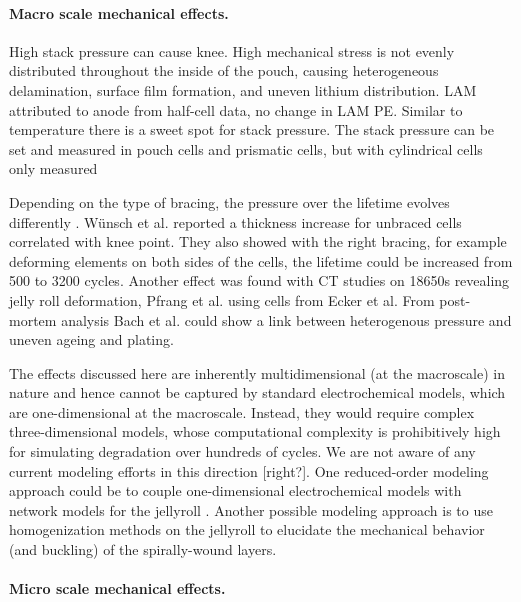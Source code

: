 \documentclass{article}
\begin{document}
\paragraph{Macro scale mechanical effects.}

High stack pressure can cause knee. High mechanical stress is not evenly distributed throughout the inside of the pouch, causing heterogeneous delamination, surface film formation, and uneven lithium distribution. LAM attributed to anode from half-cell data, no change in LAM PE. Similar to temperature there is a sweet spot for stack pressure\cite{cannarella_stress_2014}. The stack pressure can be set and measured in pouch cells \cite{wunsch_investigation_2019} and prismatic cells\cite{cannarella_stress_2014}, but  with cylindrical cells only measured\cite{willenberg_high-precision_2020}

Depending on the type of bracing, the pressure over the lifetime evolves differently . Wünsch et al. \cite{wunsch_investigation_2019} reported a thickness increase for unbraced cells correlated with knee point. They also showed with the right bracing, for example deforming elements on both sides of the cells, the lifetime could be increased from 500 to 3200 cycles.
Another effect was found with CT studies on 18650s revealing jelly roll deformation, Pfrang et al. \cite{pfrang_long-term_2018} using cells from Ecker et al. \cite{ecker_calendar_2014}
From post-mortem analysis Bach et al. could show a link between heterogenous pressure and uneven ageing and plating\cite{bach_nonlinear_2016}.

The effects discussed here are inherently multidimensional (at the macroscale) in nature and hence cannot be captured by standard electrochemical models, which are one-dimensional at the macroscale. Instead, they would require complex three-dimensional models, whose computational complexity is prohibitively high for simulating degradation over hundreds of cycles. We are not aware of any current modeling efforts in this direction [right?]. One reduced-order modeling approach could be to couple one-dimensional electrochemical models with network models for the jellyroll \cite{tranter_probing_2020}.  Another possible modeling approach is to use homogenization methods on the jellyroll \cite{psaltis_homogenisation_2020} to elucidate the mechanical behavior (and buckling) of the spirally-wound layers.

\paragraph{Micro scale mechanical effects.}
\end{document}
